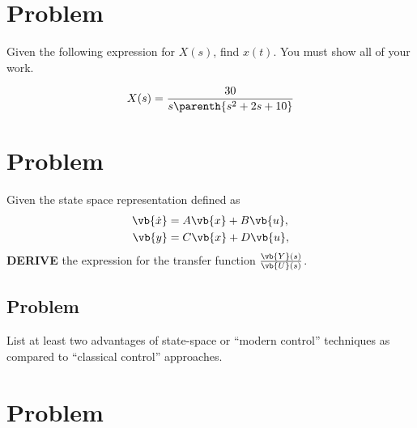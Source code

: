 \documentclass[titlepage, 11pt, reqno]{article}    %
\begin{document}
\newpage
\thispagestyle{plain}

\section{Problem}
Given the following expression for \( X(s) \), find \( x(t)\). 
You must show all of your work.

\begin{align*}
    X(s) = \frac{30}{s\parenth{s^2 + 2s + 10}}
\end{align*}

\clearpage\newpage
\section{Problem}
Given the state space representation defined as
\begin{align*}
    \vb{\dot{x}} &= A \vb{x} + B \vb{u}, \\
    \vb{y} &= C \vb{x} + D\vb{u},
\end{align*}
\textbf{DERIVE} the expression for the transfer function \(\frac{\vb{Y}(s)}{\vb{U}(s)}\).
\vspace{13cm}
\subsection{Problem}

List at least two advantages of state-space or ``modern control'' techniques as compared to ``classical control'' approaches.
\vspace{5cm}
\clearpage
\section{Problem}
\end{document}
